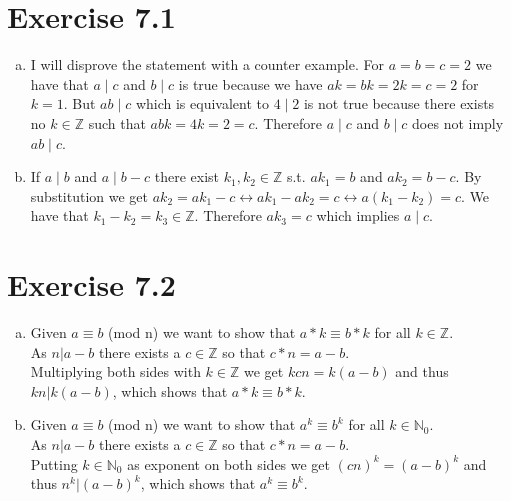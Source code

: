 \documentclass{article} %
\newcommand{\homeworkNumber}{7}
\begin{document}
\section*{Exercise \homeworkNumber.1}

\begin{enumerate}[(a)]
	\item I will disprove the statement with a counter example. For \( a = b = c = 2 \) we have that \( a \mid c \) and \( b \mid c \) is true because we have \( ak = bk = 2k = c = 2 \) for \( k = 1 \). But \( ab \mid c \) which is equivalent to \( 4 \mid 2 \) is not true because there exists no \( k \in \mathbb{Z} \) such that \( abk = 4k = 2 = c\). Therefore \( a \mid c \) and \( b \mid c \) does not imply \( ab \mid c \).
	\item If \( a \mid b \) and \( a \mid b-c \) there exist \( k_{1}, k_{2} \in  \mathbb{Z} \) s.t. \( ak_{1} = b \) and \( ak_{2}=b-c \). By substitution we get \( ak_{2} = ak_{1}-c \leftrightarrow ak_{1} - ak_{2} = c \leftrightarrow a(k_{1}-k_{2}) = c \). We have that \( k_{1}-k_{2} = k_{3} \in \mathbb{Z} \). Therefore \( ak_{3} = c \) which implies \( a \mid c \).
\end{enumerate}



\section*{Exercise \homeworkNumber.2}

\begin{enumerate}[(a)]
	\item
		Given $a \equiv b $ (mod n) we want to show that $a*k \equiv b*k$ for all $k \in \mathbb Z$.\\
		As $n \lvert a-b$ there exists a $c \in \mathbb Z$ so that $c*n = a-b$. \\
		Multiplying both sides with $k \in \mathbb Z$ we get $kcn = k(a-b)$ and thus $kn \lvert k(a-b)$, which shows that $a*k \equiv b*k$.
	\item
		Given $a \equiv b $ (mod n) we want to show that $a^k \equiv b^k$ for all $k \in \mathbb N_0$. \\
		As $n \lvert a-b$ there exists a $c \in \mathbb Z$ so that $c*n = a-b$. \\
		Putting $k \in \mathbb N_0$ as exponent on both sides we get $(cn)^k = (a-b)^k$ and thus $n^k \lvert (a-b)^k$, which shows that $a^k \equiv b^k$.
\end{enumerate}
\end{document}
